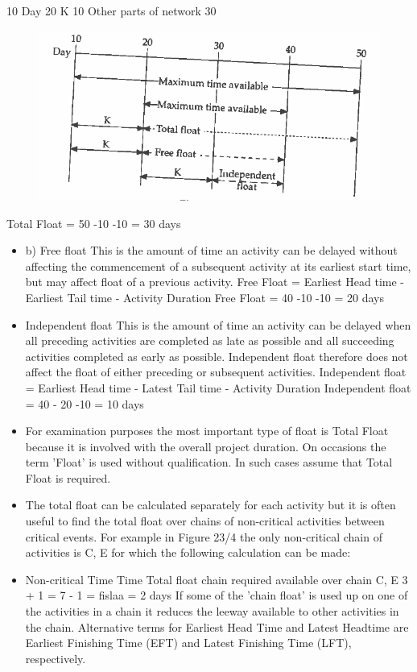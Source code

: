 \documentclass[]{report}
\begin{document}
10 Day   
20 
K 10 Other parts of network 30 

\begin{figure}
\centering
\includegraphics[width=0.4\linewidth]{images4/333-b}
\caption{}
\label{fig:333-b}
\end{figure}


Total Float = 50 -10 -10 = 30 days  

\begin{itemize}
	\item b) Free float This is the amount of time an activity can be delayed without affecting the commencement of a subsequent activity at its earliest start time, but may affect float of a previous activity. Free Float = Earliest Head time - Earliest Tail time - Activity Duration Free Float = 40 -10 -10 = 20 days  
	
\item Independent float This is the amount of time an activity can be delayed when all preceding activities are completed as late as possible and all succeeding activities completed as early as possible. Independent float therefore does not affect the float of either preceding or subsequent activities. Independent float = Earliest Head time - Latest Tail time - Activity Duration Independent float = 40 - 20 -10 = 10 days  
	
\item For examination purposes the most important type of float is Total Float because it is involved with the overall project duration. On occasions the term 'Float' is used without qualification. In such cases assume that Total Float is required. 
	
\item The total float can be calculated separately for each activity but it is often useful to find the total float over chains of non-critical activities between critical events. For example in Figure 23/4 the only non-critical chain of activities is C, E for which the following calculation can be made: 
\item 	Non-critical Time Time Total float chain required available over chain C, E 3 + 1 =  7 - 1 = fislaa  = 2 days 
	If some of the 'chain float' is used up on one of the activities in a chain it reduces the leeway available to other activities in the chain. Alternative terms for Earliest Head Time and Latest Headtime are Earliest Finishing Time (EFT) and Latest Finishing Time (LFT), respectively.
	
\end{itemize}
\end{document}
